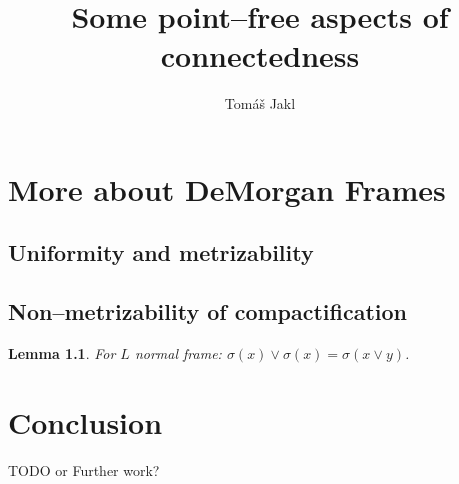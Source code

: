 \documentclass[12pt,a4paper]{report}
\title{Some point--free aspects of connectedness}
\author{Tom\'a\v s Jakl}
\newcounter{thmCounter}[section]
\theoremstyle{newthmstyle}
\newtheorem{lemma}[thmCounter]{Lemma}
\theoremstyle{newthmstyleNormal}
\begin{document}
\maketitle
\tableofcontents








\chapter{More about DeMorgan Frames}
\section{Uniformity and metrizability}
\section{Non--metrizability of compactification}
\begin{lemma}
    For $L$ normal frame: $\sigma(x)\vee\sigma(x) = \sigma(x\vee y)$.
\end{lemma}

\chapter{Conclusion}
TODO or Further work?





\clearpage
\printindex
\end{document}
